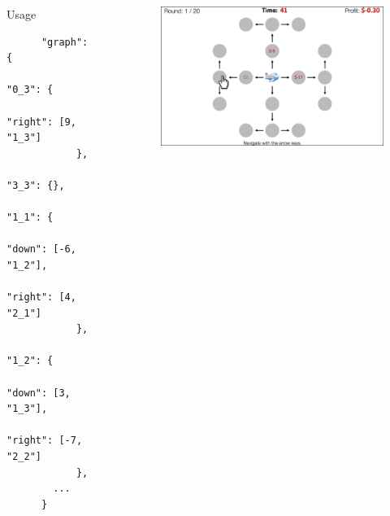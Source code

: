 \documentclass[final]{beamer}
\newlength{\sepwid}
\newlength{\onecolwid}
\newlength{\twocolwid}
\begin{document}
\begin{frame}[t]
\begin{columns}[t]
\begin{column}{\onecolwid}
  \begin{block}{Usage}\label{usage}
    \begin{lstlisting}
      "graph": {
            "0_3": {
              "right": [9, "1_3"]
            },
            "3_3": {},
            "1_1": {
              "down": [-6, "1_2"],
              "right": [4, "2_1"]
            },
            "1_2": {
              "down": [3, "1_3"],
              "right": [-7, "2_2"]
            },
        ...
      }
    \end{lstlisting}
  \end{block}

\end{column} %

\begin{column}{\sepwid}\end{column} %
\begin{column}{\twocolwid} %

  \begin{figure}
    \includegraphics[width=0.9\linewidth]{figs/paradigm_illustration1.png}
  \end{figure}


  \begin{columns}[t,totalwidth=\twocolwid] %
    
    \begin{column}{\onecolwid} %
      

\end{column}
\end{columns}
\end{column}
\end{columns}
\end{frame}
\end{document}
